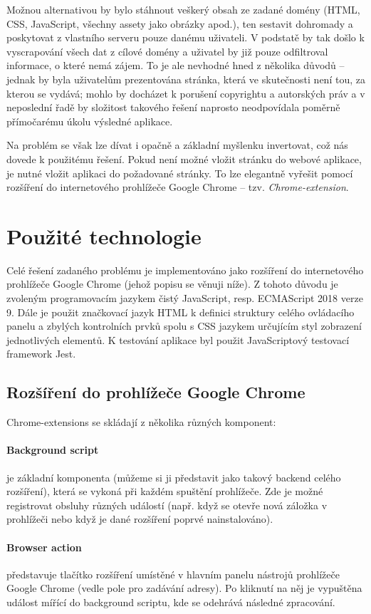 \documentclass[thesis=B,czech]{FITthesis}[2012/06/26]
\begin{document}
Možnou alternativou by bylo stáhnout veškerý obsah ze zadané domény (HTML, CSS, JavaScript, všechny assety jako obrázky apod.), ten sestavit dohromady a poskytovat z vlastního serveru pouze danému uživateli. V podstatě by tak došlo k vyscrapování všech dat z cílové domény a uživatel by již pouze odfiltroval informace, o které nemá zájem. To je ale nevhodné hned z několika důvodů -- jednak by byla uživatelům prezentována stránka, která ve skutečnosti není tou, za kterou se vydává; mohlo by docházet k porušení copyrightu a autorských práv a v neposlední řadě by složitost takového řešení naprosto neodpovídala poměrně přímočarému úkolu výsledné aplikace.

Na problém se však lze dívat i opačně a základní myšlenku invertovat, což nás dovede k použitému řešení. Pokud není možné vložit stránku do webové aplikace, je nutné vložit aplikaci do požadované stránky. To lze elegantně vyřešit pomocí rozšíření do internetového prohlížeče Google Chrome -- tzv. \emph{Chrome-extension}.

\section{Použité technologie}	
Celé řešení zadaného problému je implementováno jako rozšíření do internetového prohlížeče Google Chrome (jehož popisu se věnuji níže). Z tohoto důvodu je zvoleným programovacím jazykem čistý JavaScript, resp. ECMAScript 2018 verze 9. Dále je použit značkovací jazyk HTML k definici struktury celého ovládacího panelu a zbylých kontrolních prvků spolu s CSS jazykem určujícím styl zobrazení jednotlivých elementů. K testování aplikace byl použit JavaScriptový testovací framework Jest.

\subsection{Rozšíření do prohlížeče Google Chrome}
Chrome-extensions se skládají z několika různých komponent:
\paragraph{Background script} je základní komponenta (můžeme si ji představit jako takový backend celého rozšíření), která se vykoná při každém spuštění prohlížeče. Zde je možné registrovat obsluhy různých událostí (např. když se otevře nová záložka v prohlížeči nebo když je dané rozšíření poprvé nainstalováno). 
\paragraph{Browser action} představuje tlačítko rozšíření umístěné v hlavním panelu nástrojů prohlížeče Google Chrome (vedle pole pro zadávání adresy). Po kliknutí na něj je vypuštěna událost mířící do background scriptu, kde se odehrává následné zpracování.
\end{document}
